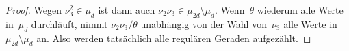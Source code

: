 \begin{proof}
Wegen $\nu_3^2 \in \mu_d$ ist dann auch $\nu_2 \nu_3 \in \mu_{2d} \setminus \mu_d$. Wenn~$\theta$ wiederum alle Werte in~$\mu_d$ durchläuft, nimmt $\nu_2 \nu_3 / \theta$ unabhängig von der Wahl von~$\nu_3$ alle Werte in~$\mu_{2d} \setminus \mu_d$ an. Also werden tatsächlich alle regulären Geraden aufgezählt.
\end{proof}
